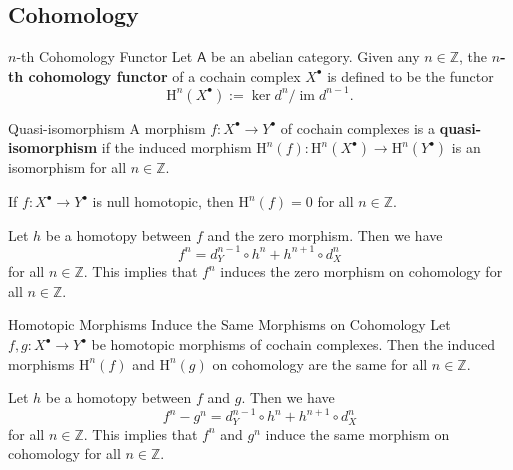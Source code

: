 \subsection{Cohomology}


\begin{definition}{$n$-th Cohomology Functor}{}
    Let $\mathsf{A}$ be an abelian category. Given any $n\in \mathbb{Z}$, the \textbf{$n$-th cohomology functor} of a cochain complex $X^{\bullet}$ is defined to be the functor
    \[
    \mathrm{H}^n(X^{\bullet}):=\ker d^n/\operatorname{im}d^{n-1}.
    \]
\end{definition}


\begin{definition}{Quasi-isomorphism}{}
    A morphism $f: X^{\bullet} \rightarrow Y^{\bullet}$ of cochain complexes is a \textbf{quasi-isomorphism} if the induced morphism $\mathrm{H}^n(f):\mathrm{H}^n(X^{\bullet})\to \mathrm{H}^n(Y^{\bullet})$ is an isomorphism for all $n\in \mathbb{Z}$.
\end{definition}

\begin{lemma}{}{}
    If $f: X^{\bullet} \rightarrow Y^{\bullet}$ is null homotopic, then $\mathrm{H}^n(f)=0$ for all $n\in \mathbb{Z}$.
\end{lemma}

\begin{prf}
    Let $h$ be a homotopy between $f$ and the zero morphism. Then we have
    \[
    f^n=d^{n-1}_Y \circ h^n+h^{n+1} \circ d^n_X
    \]
    for all $n\in \mathbb{Z}$. This implies that $f^n$ induces the zero morphism on cohomology for all $n\in \mathbb{Z}$.
\end{prf}

\begin{proposition}{Homotopic Morphisms Induce the Same Morphisms on Cohomology}{}
    Let $f, g: X^{\bullet} \rightarrow Y^{\bullet}$ be homotopic morphisms of cochain complexes. Then the induced morphisms $\mathrm{H}^n(f)$ and $\mathrm{H}^n(g)$ on cohomology are the same for all $n\in \mathbb{Z}$.
\end{proposition}

\begin{prf}
    Let $h$ be a homotopy between $f$ and $g$. Then we have
    \[
    f^n-g^n=d^{n-1}_Y \circ h^n+h^{n+1} \circ d^n_X
    \]
    for all $n\in \mathbb{Z}$. This implies that $f^n$ and $g^n$ induce the same morphism on cohomology for all $n\in \mathbb{Z}$.
\end{prf}

